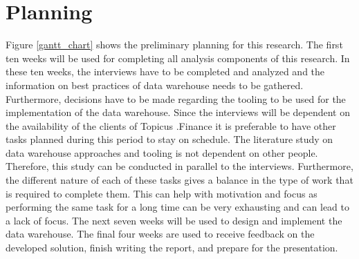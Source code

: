 \documentclass[11pt]{article}
\begin{document}
\section{Planning}
Figure \ref{gantt_chart} shows the preliminary planning for this research. The first ten weeks will be used for completing all analysis components of this research. In these ten weeks, the interviews have to be completed and analyzed and the information on best practices of data warehouse needs to be gathered. Furthermore, decisions have to be made regarding the tooling to be used for the implementation of the data warehouse. Since the interviews will be dependent on the availability of the clients of Topicus .Finance it is preferable to have other tasks planned during this period to stay on schedule. The literature study on data warehouse approaches and tooling is not dependent on other people. Therefore, this study can be conducted in parallel to the interviews. Furthermore, the different nature of each of these tasks gives a balance in the type of work that is required to complete them. This can help with motivation and focus as performing the same task for a long time can be very exhausting and can lead to a lack of focus. The next seven weeks will be used to design and implement the data warehouse. The final four weeks are used to receive feedback on the developed solution, finish writing the report, and prepare for the presentation.
\end{document}
